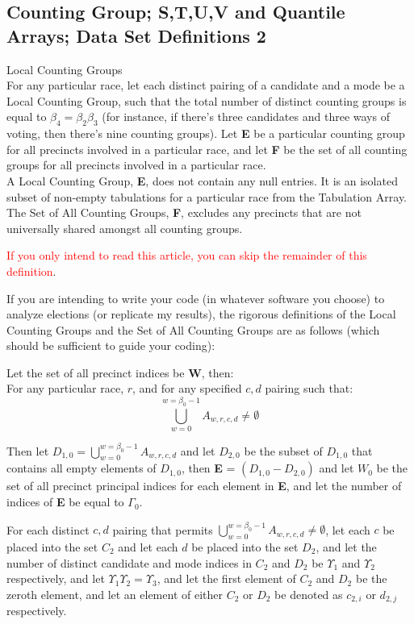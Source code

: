 \subsection{Counting Group; S,T,U,V and Quantile Arrays; Data Set Definitions 2}
\begin{definition}{Local Counting Groups}\\
For any particular race, let each distinct pairing of a candidate and a mode be a Local Counting Group, such that the total number of distinct counting groups is equal to $\beta_{4}=\beta_{2}\beta_{3}$ (for instance, if there's three candidates and three ways of voting, then there's nine counting groups). Let \textbf{E} be a particular counting group for all precincts involved in a particular race, and let \textbf{F} be the set of all counting groups for all precincts involved in a particular race.\\

A Local Counting Group, \textbf{E}, does not contain any null entries. It is an isolated subset of non-empty tabulations for a particular race from the Tabulation Array. The Set of All Counting Groups, \textbf{F}, excludes any precincts that are not universally shared amongst all counting groups.

\textcolor{red}{If you only intend to read this article, you can skip the remainder of this definition}. 

If you are intending to write your code (in whatever software you choose) to analyze elections (or replicate my results), the rigorous definitions of the Local Counting Groups and the Set of All Counting Groups are as follows (which should be sufficient to guide your coding):

Let the set of all precinct indices be \textbf{W}, then:\\
For any particular race, $r$, and for any specified $c,d$ pairing such that:
$$\bigcup_{w=0}^{w=\beta_{0}-1}A_{w,r,c,d}\neq\emptyset$$

Then let $D_{1,0}=\bigcup_{w=0}^{w=\beta_{0}-1}A_{w,r,c,d}$ and let $D_{2,0}$ be the subset of $D_{1,0}$ that contains all empty elements of $D_{1,0}$, then \textbf{E} = $(D_{1,0}-D_{2,0})$ and let $W_{0}$ be the set of all precinct principal indices for each element in \textbf{E}, and let the number of indices of \textbf{E} be equal to $\Gamma_{0}$.

For each distinct $c,d$ pairing that permits $\bigcup_{w=0}^{w=\beta_{0}-1}A_{w,r,c,d}\neq\emptyset$, let each $c$ be placed into the set $C_{2}$ and let each $d$ be placed into the set $D_{2}$, and let the number of distinct candidate and mode indices in $C_{2}$ and $D_{2}$ be $\Upsilon_{1}$ and $\Upsilon_{2}$ respectively, and let $\Upsilon_{1} \Upsilon_{2}=\Upsilon_{3}$, and let the first element of $C_{2}$ and $D_{2}$ be the zeroth element, and let an element of either $C_{2}$ or $D_{2}$ be denoted as $c_{2,i}$ or $d_{2,j}$ respectively.


\end{definition}

